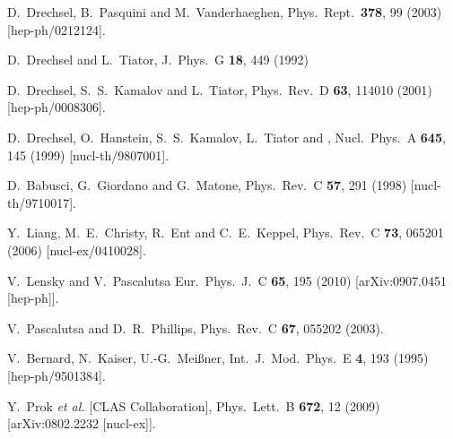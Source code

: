 \documentclass[prc,twocolumn,showpacs,preprintnumbers,amsmath,amssymb
,superscriptaddress,a4paper,nofootinbib
]{revtex4-1}
\begin{document}
\begin{thebibliography}{99}
  D.~Drechsel, B.~Pasquini and M.~Vanderhaeghen,
  Phys.\ Rept.\  {\bf 378}, 99 (2003)
  [hep-ph/0212124].


  D.~Drechsel and L.~Tiator,
  J.\ Phys.\ G {\bf 18}, 449 (1992)

  D.~Drechsel, S.~S.~Kamalov and L.~Tiator,
  Phys.\ Rev.\ D {\bf 63}, 114010 (2001)
  [hep-ph/0008306].
  
  D.~Drechsel, O.~Hanstein, S.~S.~Kamalov, L.~Tiator and ,
  Nucl.\ Phys.\ A {\bf 645}, 145 (1999)
  [nucl-th/9807001].

  D.~Babusci, G.~Giordano and G.~Matone,
  Phys.\ Rev.\ C {\bf 57}, 291 (1998)
  [nucl-th/9710017].
  
  Y.~Liang, M.~E.~Christy, R.~Ent and C.~E.~Keppel,
  Phys.\ Rev.\ C {\bf 73}, 065201 (2006)
  [nucl-ex/0410028].

  V.~Lensky and V.~Pascalutsa
  Eur.\ Phys.\ J.\ C {\bf 65}, 195 (2010)
  [arXiv:0907.0451 [hep-ph]].

 V.~Pascalutsa and D.~R.~Phillips,
  Phys.\ Rev.\  C {\bf 67}, 055202 (2003).



  V.~Bernard, N.~Kaiser, U.-G.~Mei\ss ner,
  Int.\ J.\ Mod.\ Phys.\ E {\bf 4}, 193 (1995)
  [hep-ph/9501384].

 Y.~Prok {\it et al.}  [CLAS Collaboration],
  Phys.\ Lett.\ B {\bf 672}, 12 (2009)
  [arXiv:0802.2232 [nucl-ex]].


\end{thebibliography}
\end{document}
